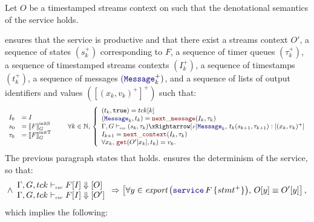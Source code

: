 \begin{skippableproof}
    Let $O$ be a timestamped streams context on \tck such that the denotational semantics of the
    service  holds.

     ensures that the service is productive and that
    there exist a streams context $O'$, a sequence of states $(s_k^+)$ corresponding to $F$,
    a sequence of timer queues $(\tau_k^+)$, a sequence of timestamped streams contexts $(I_k^+)$, a
    sequence of timestamps $(t_k^+)$, a sequence of messages $(\mess_k^+)$, and a sequence of lists
    of output identifiers and values $([(x_k, v_k)^+]^+)$ such that:
    \begin{equation*}
        \begin{array}{ll}
            I_0    & = I             \\
            s_0    & = \initstate{F} \\
            \tau_0 & = \inittimer{F} \\
        \end{array} \qquad
        \forall k \in \N, \,
        \left\{
        \begin{array}{ll}
            (t_k, \true) = \tck[k]                                                         \\
            (\mess_k, t_k) = \nextMess{I_k}{\tau_k}                                        \\
            \serviceOpSem{s_k}{\tau_k}{F}{\mess_k}{t_k}{s_{k+1}}{\tau_{k+1}}{(x_k, v_k)^+} \\
            I_{k+1} = \nextContext{I_k}{\tau_k}                                            \\
            \forall x_k, \, \getAt{O'[x_k]}{t_k}=v_k.
        \end{array}
        \right.
    \end{equation*}
    The previous paragraph states that  holds.
     ensures the determinism of the service, so that:
    \begin{equation*}
        \wedge \begin{array}{l}
            \serviceDenot{\tck}{I}{F}{O} \\
            \serviceDenot{\tck}{I}{F}{O'}
        \end{array} \Rightarrow
        \left[\forall y \in \exportSet{\service{F}{stmt^+}}, \, O[y] \equiv O'[y]\right],
    \end{equation*}
    which implies the following:

\end{skippableproof}
